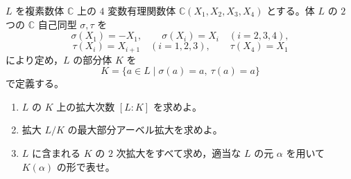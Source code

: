 \documentclass[12pt]{jlreq}
\newcommand{\C}{\mathbb{C}}
\begin{document}
\(L\) を複素数体 \(\C\) 上の \(4\) 変数有理関数体
\(\C(X_1,X_2,X_3,X_4)\) とする。体 \(L\) の \(2\) つの \(\C\) 自己同型 \(\sigma,\tau\) を
\[
  \sigma(X_1)=-X_1,\qquad
  \sigma(X_i)=X_i\quad (i=2,3,4),
\]
\[
  \tau(X_i)=X_{i+1}\quad (i=1,2,3),\qquad
  \tau(X_4)=X_1
\]
により定め，\(L\) の部分体 \(K\) を
\[
  K=\{a\in L\mid \sigma(a)=a,\ \tau(a)=a\}
\]
で定義する。

\begin{enumerate}
  \item \(L\) の \(K\) 上の拡大次数 \([L:K]\) を求めよ。
  \item 拡大 \(L/K\) の最大部分アーベル拡大を求めよ。
  \item \(L\) に含まれる \(K\) の \(2\) 次拡大をすべて求め，適当な \(L\) の元 \(\alpha\) を用いて \(K(\alpha)\) の形で表せ。
\end{enumerate}
\end{document}
